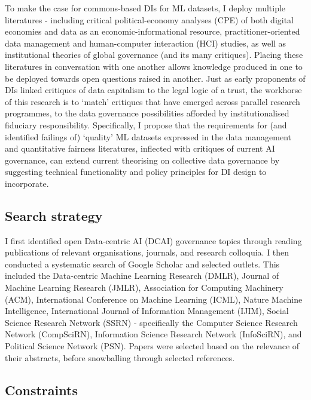 To make the case for commons-based DIs for ML datasets, I deploy multiple literatures - including critical political-economy analyses (CPE) of both digital economies and data as an economic-informational resource, practitioner-oriented data management and human-computer interaction (HCI) studies, as well as institutional theories of global governance (and its many critiques). Placing these literatures in conversation with one another allows knowledge produced in one to be deployed towards open questions raised in another. Just as early proponents of DIs linked critiques of data capitalism to the legal logic of a trust, the workhorse of this research is to `match’ critiques that have emerged across parallel research programmes, to the data governance possibilities afforded by institutionalised fiduciary responsibility. Specifically, I propose that the requirements for (and identified failings of) `quality' ML datasets expressed in the data management and quantitative fairness literatures, inflected with critiques of current AI governance, can extend current theorising on collective data governance by suggesting technical functionality and policy principles for DI design to incorporate.

\subsection*{Search strategy}


I first identified open Data-centric AI (DCAI) governance topics through reading publications of relevant organisations, journals, and research colloquia. I then conducted a systematic search of Google Scholar and selected outlets. This included the Data-centric Machine Learning Research (DMLR), Journal of Machine Learning Research (JMLR), Association for Computing Machinery (ACM), International Conference on Machine Learning (ICML), Nature Machine Intelligence, International Journal of Information Management (IJIM), Social Science Research Network (SSRN) - specifically the Computer Science Research Network (CompSciRN), Information Science Research Network (InfoSciRN), and Political Science Network (PSN). Papers were selected based on the relevance of their abstracts, before snowballing through selected references.

\subsection*{Constraints}

